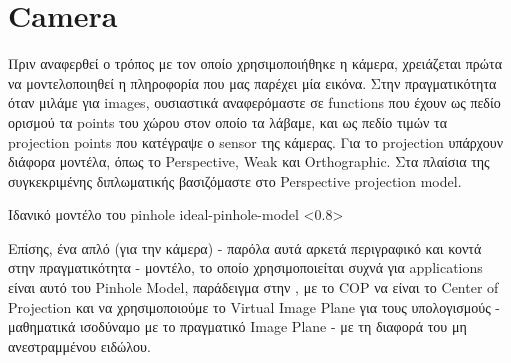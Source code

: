 
\section{Camera} \label{sec:design-implementation-camera}

Πριν αναφερθεί ο τρόπος με τον οποίο χρησιμοποιήθηκε η κάμερα, χρειάζεται πρώτα να μοντελοποιηθεί η πληροφορία που μας παρέχει μία εικόνα. Στην πραγματικότητα όταν μιλάμε για images, ουσιαστικά αναφερόμαστε σε functions που έχουν ως πεδίο ορισμού τα  points του χώρου στον οποίο τα λάβαμε, και ως πεδίο τιμών τα  projection points που κατέγραψε ο sensor της κάμερας. Για το projection υπάρχουν διάφορα μοντέλα, όπως το Perspective, Weak και Orthographic. Στα πλαίσια της συγκεκριμένης διπλωματικής βασιζόμαστε στο Perspective projection model.


%
{Ιδανικό μοντέλο του pinhole}%
{ideal-pinhole-model}%
<0.8>

Επίσης, ένα απλό (για την κάμερα) - παρόλα αυτά αρκετά περιγραφικό και κοντά στην πραγματικότητα - μοντέλο, το οποίο χρησιμοποιείται συχνά για  applications είναι αυτό του Pinhole Model, παράδειγμα στην , με το COP να είναι το Center of Projection και να χρησιμοποιούμε το Virtual Image Plane για τους υπολογισμούς - μαθηματικά ισοδύναμο με το πραγματικό Image Plane - με τη διαφορά του μη ανεστραμμένου ειδώλου.

